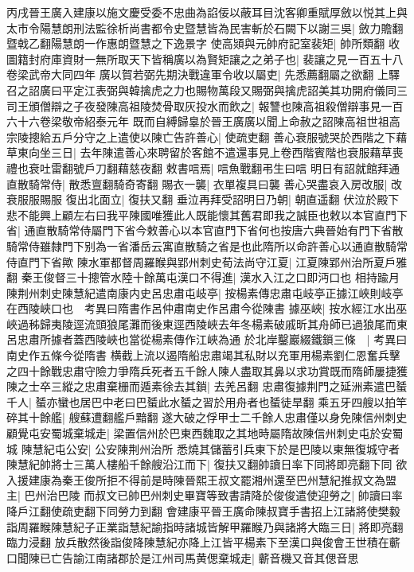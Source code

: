 丙戌晉王廣入建康以施文慶受委不忠曲為諂佞以蔽耳目沈客卿重賦厚斂以悦其上與太市令陽慧朗刑法監徐析尚書都令史暨慧皆為民害斬於石闕下以謝三吳|{
	斂力贍翻暨戟乙翻陽慧朗一作惠朗暨慧之下逸景字}
使高熲與元帥府記室裴矩|{
	帥所類翻}
收圖籍封府庫資財一無所取天下皆稱廣以為賢矩讓之之弟子也|{
	裴讓之見一百五十八卷梁武帝大同四年}
廣以賀若弼先期決戰違軍令收以屬吏|{
	先悉薦翻屬之欲翻}
上驛召之詔廣曰平定江表弼與韓擒虎之力也賜物萬段又賜弼與擒虎詔美其功開府儀同三司王頒僧辯之子夜發陳高祖陵焚骨取灰投水而飲之|{
	報讐也陳高祖殺僧辯事見一百六十六卷梁敬帝紹泰元年}
既而自縛歸辠於晉王廣廣以聞上命赦之詔陳高祖世祖高宗陵摠給五戶分守之上遣使以陳亡告許善心|{
	使疏吏翻}
善心衰服號哭於西階之下藉草東向坐三日|{
	去年陳遣善心來聘留於客館不遣還事見上卷西階賓階也衰服藉草喪禮也衰吐雷翻號戶刀翻藉慈夜翻}
敕書唁焉|{
	唁魚戰翻弔生曰唁}
明日有詔就館拜通直散騎常侍|{
	散悉亶翻騎奇寄翻}
賜衣一襲|{
	衣單複具曰襲}
善心哭盡哀入房改服|{
	改衰服服賜服}
復出北面立|{
	復扶又翻}
垂泣再拜受詔明日乃朝|{
	朝直遥翻}
伏泣於殿下悲不能興上顧左右曰我平陳國唯獲此人既能懷其舊君即我之誠臣也敕以本官直門下省|{
	通直散騎常侍屬門下省今敕善心以本官直門下省何也按唐六典晉始有門下省散騎常侍雖隸門下别為一省潘岳云寓直散騎之省是也此隋所以命許善心以通直散騎常侍直門下省歟}
陳水軍都督周羅睺與郢州刺史荀法尚守江夏|{
	江夏陳郢州治所夏戶雅翻}
秦王俊督三十摠管水陸十餘萬屯漢口不得進|{
	漢水入江之口即沔口也}
相持踰月陳荆州刺史陳慧紀遣南康内史呂忠肅屯岐亭|{
	按楊素傳忠肅屯岐亭正據江峽則岐亭在西陵峽口也　考異曰隋書作呂仲肅南史作呂肅今從陳書}
據巫峽|{
	按水經江水出巫峽過秭歸夷陵逕流頭狼尾灘而後東逕西陵峽去年冬楊素破戚昕其舟師已過狼尾而東呂忠肅所據者蓋西陵峽也當從楊素傳作江峽為通}
於北岸鑿巖綴鐵鎖三條　|{
	考異曰南史作五條今從隋書}
横截上流以遏隋船忠肅竭其私財以充軍用楊素劉仁恩奮兵擊之四十餘戰忠肅守險力爭隋兵死者五千餘人陳人盡取其鼻以求功賞既而隋師屢捷獲陳之士卒三縱之忠肅棄栅而遁素徐去其鎖|{
	去羌呂翻}
忠肅復據荆門之延洲素遣巴蜑千人|{
	蜑亦蠻也居巴中老曰巴蜑此水蜑之習於用舟者也蜑徒旱翻}
乘五牙四艘以拍竿碎其十餘艦|{
	艘蘇遭翻艦戶黯翻}
遂大破之俘甲士二千餘人忠肅僅以身免陳信州刺史顧覺屯安蜀城棄城走|{
	梁置信州於巴東西魏取之其地時屬隋故陳信州刺史屯於安蜀城}
陳慧紀屯公安|{
	公安陳荆州治所}
悉燒其儲蓄引兵東下於是巴陵以東無復城守者陳慧紀帥將士三萬人樓船千餘艘沿江而下|{
	復扶又翻帥讀日率下同將即亮翻下同}
欲入援建康為秦王俊所拒不得前是時陳晉熙王叔文罷湘州還至巴州慧紀推叔文為盟主|{
	巴州治巴陵}
而叔文已帥巴州刺史畢寶等致書請降於俊俊遣使迎勞之|{
	帥讀曰率降戶江翻使疏吏翻下同勞力到翻}
會建康平晉王廣命陳叔寶手書招上江諸將使樊毅詣周羅睺陳慧紀子正業詣慧紀諭指時諸城皆解甲羅睺乃與諸將大臨三日|{
	將即亮翻臨力浸翻}
放兵散然後詣俊降陳慧紀亦降上江皆平楊素下至漢口與俊會王世積在蘄口聞陳已亡告諭江南諸郡於是江州司馬黄偲棄城走|{
	蘄音機又音其偲音思}
